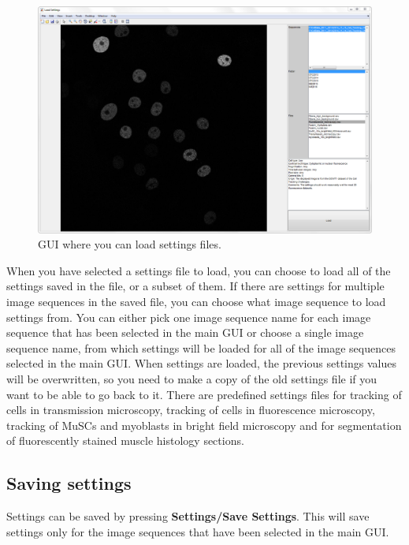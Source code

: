 \documentclass[a4paper, oneside, onecolumn, 11pt]{article}
\newcommand{\menu}[1]{\textbf{#1}}
\begin{document}
\begin{figure}[!ht]
\begin{center}
\includegraphics[width = \columnwidth]{figures/loadSettings}
\caption{GUI where you can load settings files.}
\label{fig:load-settings}
\end{center}
\end{figure}

When you have selected a settings file to load, you can choose to load all of the settings saved in the file, or a subset of them. If there are settings for multiple image sequences in the saved file, you can choose what image sequence to load settings from. You can either pick one image sequence name for each image sequence that has been selected in the main GUI or choose a single image sequence name, from which settings will be loaded for all of the image sequences selected in the main GUI. When settings are loaded, the previous settings values will be overwritten, so you need to make a copy of the old settings file if you want to be able to go back to it. There are predefined settings files for tracking of cells in transmission microscopy, tracking of cells in fluorescence microscopy, tracking of MuSCs and myoblasts in bright field microscopy and for segmentation of fluorescently stained muscle histology sections.

\subsection{Saving settings}
Settings can be saved by pressing \menu{Settings/\allowbreak Save Settings}. This will save settings only for the image sequences that have been selected in the main GUI.
\end{document}
